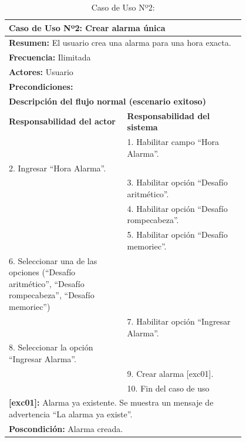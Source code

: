 \begin{table}[H]
    \centering
    \caption{Caso de Uso Nº2: }
    
    \begin{tabular}{| p{0.4\linewidth} | p{0.4\linewidth} |}
        \hline
        \multicolumn{2}{|l|}{\textbf{Caso de Uso Nº2:} Crear alarma única} \\
        \hline
        \multicolumn{2}{|l|}{\textbf{Resumen:} El usuario crea una alarma para una hora exacta.} \\
        \hline
        \multicolumn{2}{|l|}{\textbf{Frecuencia:} Ilimitada} \\
        \hline
        \multicolumn{2}{|l|}{\textbf{Actores:} Usuario} \\
        \hline
        \multicolumn{2}{|l|}{\textbf{Precondiciones:}} \\
        \hline
        \multicolumn{2}{|l|}{\textbf{Descripción del flujo normal (escenario exitoso)} } \\
        \hline
        \textbf{Responsabilidad del actor} & \textbf{Responsabilidad del sistema} \\
        & 1. Habilitar campo “Hora Alarma”. \\
        2. Ingresar “Hora Alarma”. &\\
        & 3. Habilitar opción “Desafío aritmético”. \\
        & 4. Habilitar opción “Desafío rompecabeza”. \\
        & 5. Habilitar opción “Desafío memoriec”. \\
        6. Seleccionar una de las opciones (“Desafío aritmético”, “Desafío rompecabeza”, “Desafío memoriec”) & \\
        & 7. Habilitar opción “Ingresar Alarma”. \\
        8. Seleccionar la opción “Ingresar Alarma”. &\\
        & 9. Crear alarma [exc01]. \\
        & 10. Fin del caso de uso \\
        \hline
        \multicolumn{2}{|p{0.8\linewidth}|}{\textbf{[exc01]:} Alarma ya existente. Se muestra un mensaje de advertencia “La alarma ya existe”.} \\
        \hline
        \multicolumn{2}{|l|}{\textbf{Poscondición:} Alarma creada.} \\
        \hline
    \end{tabular}

    \label{table:2}
\end{table}

